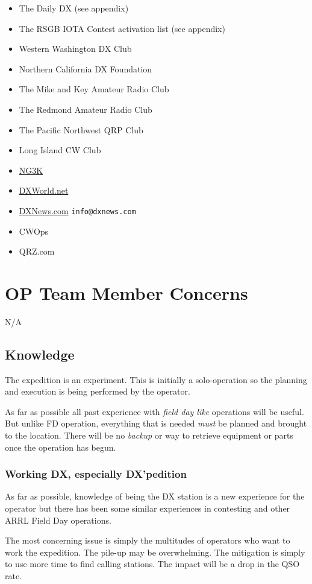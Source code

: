 \documentclass[11pt]{article}
\begin{document}
\begin{itemize}
\item The Daily DX (see appendix)
\item The RSGB IOTA Contest activation list (see appendix)
\item Western Washington DX Club
\item Northern California DX Foundation
\item The Mike and Key Amateur Radio Club
\item The Redmond Amateur Radio Club
\item The Pacific Northwest QRP Club
\item Long Island CW Club
\item \href{https://www.ng3k.com/misc/adxo.html}{NG3K}
\item \href{https://www.dx-world.net/send-news/}{DXWorld.net}
\item \href{https://dxnews.com/about/}{DXNews.com} {\texttt{info@dxnews.com}}
\item CWOps
\item QRZ.com
\end{itemize}

\section{OP Team Member Concerns}

N/A

\subsection{Knowledge}
The expedition is an experiment.  This is initially a solo-operation
so the planning and execution is being performed by the operator.
\par
As far as possible all past experience with {\textit{field day like}}
operations will be useful.  But unlike FD operation, everything that
is needed {\textit{must}} be planned and brought to the location.  There
will be no {\textit{backup}} or way to retrieve equipment or parts once
the operation has begun.

\subsubsection{Working DX, especially DX'pedition}
As far as possible, knowledge of being the DX station is a new
experience for the operator but there has been some similar experiences
in contesting and other ARRL Field Day operations.
\par
The most concerning issue is simply the multitudes of operators who
want to work the expedition.  The pile-up may be overwhelming.  The
mitigation is simply to use more time to find calling stations.  The
impact will be a drop in the QSO rate.
\par
\end{document}
